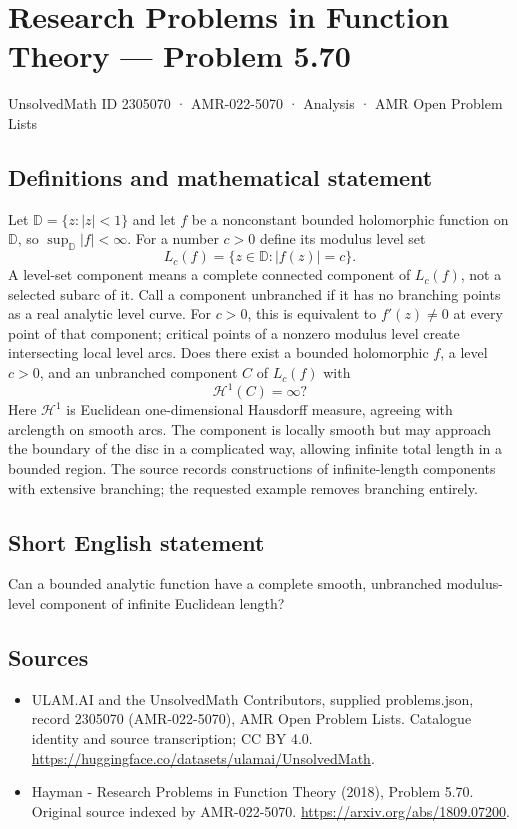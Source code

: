 \documentclass[11pt,a4paper]{article}
\begin{document}
\section*{Research Problems in Function Theory — Problem 5.70}\label{2305070}
{\small UnsolvedMath ID 2305070 · AMR-022-5070 · Analysis · AMR Open Problem Lists}
\subsection{Definitions and mathematical statement}
Let $\mathbb D=\{z:|z|<1\}$ and let $f$ be a nonconstant bounded holomorphic function on $\mathbb D$, so $\sup_{\mathbb D}|f|<\infty$. For a number $c>0$ define its modulus level set
\[
L_c(f)=\{z\in\mathbb D:|f(z)|=c\}.
\]
A level-set component means a complete connected component of $L_c(f)$, not a selected subarc of it. Call a component unbranched if it has no branching points as a real analytic level curve. For $c>0$, this is equivalent to $f'(z)\ne0$ at every point of that component; critical points of a nonzero modulus level create intersecting local level arcs.
Does there exist a bounded holomorphic $f$, a level $c>0$, and an unbranched component $C$ of $L_c(f)$ with
\[
\mathcal H^1(C)=\infty?
\]
Here $\mathcal H^1$ is Euclidean one-dimensional Hausdorff measure, agreeing with arclength on smooth arcs. The component is locally smooth but may approach the boundary of the disc in a complicated way, allowing infinite total length in a bounded region. The source records constructions of infinite-length components with extensive branching; the requested example removes branching entirely.
\subsection{Short English statement}
Can a bounded analytic function have a complete smooth, unbranched modulus-level component of infinite Euclidean length?
\subsection{Sources}
\begin{itemize}
\item[S1] ULAM.AI and the UnsolvedMath Contributors, supplied problems.json, record 2305070 (AMR-022-5070), AMR Open Problem Lists. Catalogue identity and source transcription; CC BY 4.0.
\url{https://huggingface.co/datasets/ulamai/UnsolvedMath}.
\item[S2] Hayman - Research Problems in Function Theory (2018), Problem 5.70. Original source indexed by AMR-022-5070.
\url{https://arxiv.org/abs/1809.07200}.
\end{itemize}
\end{document}
